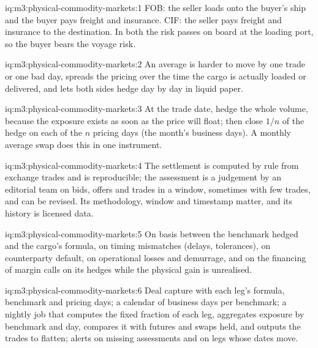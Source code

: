 \begin{solution}{iq:m3:physical-commodity-markets:1}
FOB: the seller loads onto the buyer's ship and the buyer pays freight and
insurance. CIF: the seller pays freight and insurance to the destination. In both the
risk passes on board at the loading port, so the buyer bears the voyage risk.
\end{solution}

\begin{solution}{iq:m3:physical-commodity-markets:2}
An average is harder to move by one trade or one bad day, spreads the pricing over
the time the cargo is actually loaded or delivered, and lets both sides hedge day by
day in liquid paper.
\end{solution}

\begin{solution}{iq:m3:physical-commodity-markets:3}
At the trade date, hedge the whole volume, because the exposure exists as soon as
the price will float; then close $1/n$ of the hedge on each of the $n$ pricing days
(the month's business days). A monthly average swap does this in one instrument.
\end{solution}

\begin{solution}{iq:m3:physical-commodity-markets:4}
The settlement is computed by rule from exchange trades and is reproducible; the
assessment is a judgement by an editorial team on bids, offers and trades in a
window, sometimes with few trades, and can be revised. Its methodology, window and
timestamp matter, and its history is licensed data.
\end{solution}

\begin{solution}{iq:m3:physical-commodity-markets:5}
On basis between the benchmark hedged and the cargo's formula, on timing mismatches
(delays, tolerances), on counterparty default, on operational losses and demurrage,
and on the financing of margin calls on its hedges while the physical gain is
unrealised.
\end{solution}

\begin{solution}{iq:m3:physical-commodity-markets:6}
Deal capture with each leg's formula, benchmark and pricing days; a calendar of
business days per benchmark; a nightly job that computes the fixed fraction of each
leg, aggregates exposure by benchmark and day, compares it with futures and swaps
held, and outputs the trades to flatten; alerts on missing assessments and on legs
whose dates move.
\end{solution}
